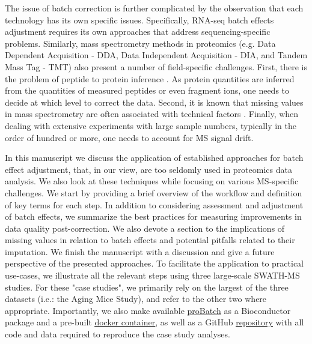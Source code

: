 \documentclass[num-refs]{wiley-article}
\begin{document}
The issue of batch correction is further complicated by the observation that each technology has its own specific issues. Specifically, RNA-seq batch effects adjustment requires its own approaches\cite{Dillies:2013aa} that address sequencing-specific problems. Similarly, mass spectrometry methods in proteomics  (e.g. Data Dependent Acquisition - DDA, Data Independent Acquisition - DIA, and Tandem Mass Tag - TMT) also present a number of field-specific challenges. First, there is the problem of peptide to protein inference \cite{Clough:2012aa, Teo:2015aa, Rosenberger2014a, Choi2014, Muntel:2019aa}. As protein quantities are inferred from the quantities of measured peptides or even fragment ions, one needs to decide at which level to correct the data. Second, it is known that missing values in mass spectrometry are often associated with technical factors \cite{Karpievitch2012, Matafora2017}. Finally, when dealing with extensive experiments with large sample numbers, typically in the order of hundred or more, one needs to account for MS signal drift. 

In this manuscript we discuss the application of established approaches for batch effect adjustment, that, in our view, are too seldomly used in proteomics data analysis. We also look at these techniques while focusing on various MS-specific challenges. We start by providing a brief overview of the workflow and definition of key terms for each step. In addition to considering assessment and adjustment of batch effects, we summarize the best practices for measuring improvements in data quality post-correction. We also devote a section to the implications of missing values in relation to batch effects and potential pitfalls related to their imputation. We finish the manuscript with a discussion and give a future perspective of the presented approaches. To facilitate the application to practical use-cases, we illustrate all the relevant steps using three large-scale SWATH-MS studies. For these "case studies", we primarily rely on the largest of the three datasets (i.e.: the Aging Mice Study), and refer to the other two where appropriate. Importantly, we also make available \underline{\href{https://bioconductor.org/packages/release/bioc/html/proBatch.html}{proBatch}} as a Bioconductor package and a pre-built \underline{\href{https://hub.docker.com/repository/docker/digitalproteomes/probatch}{docker container}}, as well as a GitHub  \underline{\href{https://github.com/symbioticMe/batch_effects_workflow_code}{repository}} with all code and data required to reproduce the case study analyses.
\end{document}
